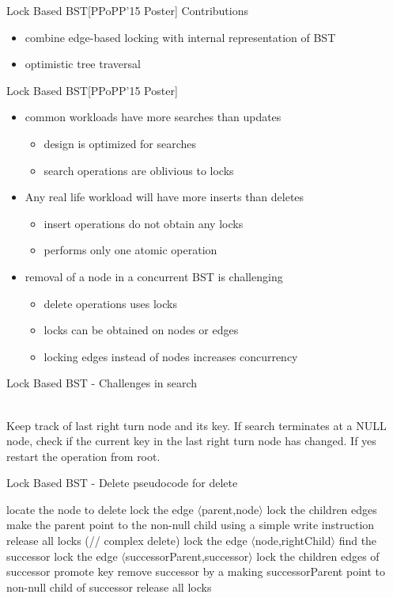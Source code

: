 \begin{frame}[c]{Lock Based BST[PPoPP'15 Poster]}
Contributions
\begin{itemize}
\item combine edge-based locking with internal representation of BST
\item optimistic tree traversal 
\end{itemize}
\end{frame}

\begin{frame}[c]{Lock Based BST[PPoPP'15 Poster]}
\begin{itemize}
\item common workloads have more searches than updates
\begin{itemize}
\item design is optimized for searches
\item search operations are oblivious to locks
\end{itemize}
\pause
\item Any real life workload will have more inserts than deletes
\begin{itemize}
\item insert operations do not obtain any locks
\item performs only one atomic operation
\end{itemize}
\pause
\item removal of a node in a concurrent BST is challenging
\begin{itemize}
\item delete operations uses locks
\item locks can be obtained on nodes or edges
\item locking edges instead of nodes increases concurrency
\end{itemize}
\end{itemize}
\end{frame}

\begin{frame}{Lock Based BST - Challenges in search}

{
\\Keep track of last right turn node and its key. If search terminates at a NULL node, check if the current key in the last right turn node has changed. If yes restart the operation from root.
}
\end{frame}

\begin{frame}[c]{Lock Based BST - Delete}
pseudocode for delete
\begin{algorithm}[H]
locate the node to delete\;
{
lock the edge $\langle$parent,node$\rangle$\;
lock the children edges\;
make the parent point to the non-null child using a simple write instruction\;
release all locks\;
}
\Else(// complex delete)
{
lock the edge $\langle$node,rightChild$\rangle$\;
find the successor\;
lock the edge $\langle$successorParent,successor$\rangle$\;
lock the children edges of successor\;
promote key\;
remove successor by a making successorParent point to non-null child of successor\;
release all locks\;
}
\end{algorithm}
\end{frame}

